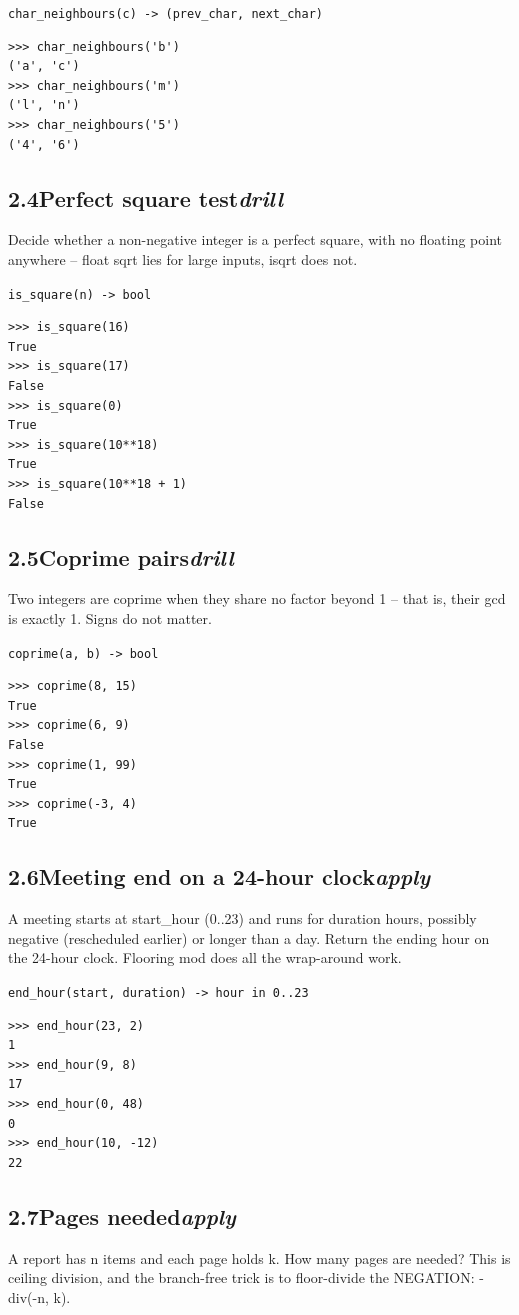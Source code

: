 \documentclass[10pt,letterpaper]{book}
\begin{document}
\noindent\texttt{char\_neighbours(c) -> (prev\_char, next\_char)}
\begin{lstlisting}[style=ex]
>>> char_neighbours('b')
('a', 'c')
>>> char_neighbours('m')
('l', 'n')
>>> char_neighbours('5')
('4', '6')
\end{lstlisting}
\subsection*{2.4\quad Perfect square test\hfill\textnormal{\textit{drill}}}
Decide whether a non-negative integer is a perfect square, with no floating point anywhere -- float sqrt lies for large inputs, isqrt does not.

\noindent\texttt{is\_square(n) -> bool}
\begin{lstlisting}[style=ex]
>>> is_square(16)
True
>>> is_square(17)
False
>>> is_square(0)
True
>>> is_square(10**18)
True
>>> is_square(10**18 + 1)
False
\end{lstlisting}
\subsection*{2.5\quad Coprime pairs\hfill\textnormal{\textit{drill}}}
Two integers are coprime when they share no factor beyond 1 -- that is, their gcd is exactly 1. Signs do not matter.

\noindent\texttt{coprime(a, b) -> bool}
\begin{lstlisting}[style=ex]
>>> coprime(8, 15)
True
>>> coprime(6, 9)
False
>>> coprime(1, 99)
True
>>> coprime(-3, 4)
True
\end{lstlisting}
\subsection*{2.6\quad Meeting end on a 24-hour clock\hfill\textnormal{\textit{apply}}}
A meeting starts at start\_hour (0..23) and runs for duration hours, possibly negative (rescheduled earlier) or longer than a day. Return the ending hour on the 24-hour clock. Flooring mod does all the wrap-around work.

\noindent\texttt{end\_hour(start, duration) -> hour in 0..23}
\begin{lstlisting}[style=ex]
>>> end_hour(23, 2)
1
>>> end_hour(9, 8)
17
>>> end_hour(0, 48)
0
>>> end_hour(10, -12)
22
\end{lstlisting}
\subsection*{2.7\quad Pages needed\hfill\textnormal{\textit{apply}}}
A report has n items and each page holds k. How many pages are needed? This is ceiling division, and the branch-free trick is to floor-divide the NEGATION: -div(-n, k).
\end{document}
